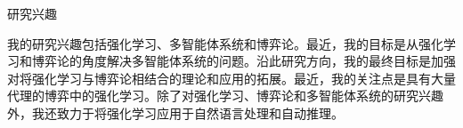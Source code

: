 \documentclass{resume} %
\begin{document}
\begin{rSection}{研究兴趣}

我的研究兴趣包括强化学习、多智能体系统和博弈论。最近，我的目标是从强化学习和博弈论的角度解决多智能体系统的问题。沿此研究方向，我的最终目标是加强对将强化学习与博弈论相结合的理论和应用的拓展。最近，我的关注点是具有大量代理的博弈中的强化学习。除了对强化学习、博弈论和多智能体系统的研究兴趣外，我还致力于将强化学习应用于自然语言处理和自动推理。

\end{rSection}
\end{document}
